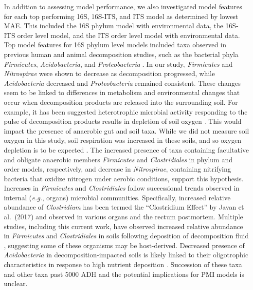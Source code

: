 \documentclass[
  10pt,
  letterpaper,
]{article}
\begin{document}
In addition to assessing model performance, we also investigated model
features for each top performing 16S, 16S-ITS, and ITS model as
determined by lowest MAE. This included the 16S phylum model with
environmental data, the 16S-ITS order level model, and the ITS order
level model with environmental data. Top model features for 16S phylum
level models included taxa observed in previous human and animal
decomposition studies, such as the bacterial phyla \emph{Firmicutes},
\emph{Acidobacteria}, and \emph{Proteobacteria}
\citep{cobaugh_functional_2015, metcalf_microbial_2016}. In our study,
\emph{Firmicutes} and \emph{Nitrospirae} were shown to decrease as
decomposition progressed, while \emph{Acidobacteria} decreased and
\emph{Proteobacteria} remained consistent. These changes seem to be
linked to differences in metabolism and environmental changes that occur
when decomposition products are released into the surrounding soil. For
example, it has been suggested heterotrophic microbial activity
responding to the pulse of decomposition products results in depletion
of soil oxygen \citep{taylor_transient_2024, keenan_mortality_2018}.
This would impact the presence of anaerobic gut and soil taxa. While we
did not measure soil oxygen in this study, soil respiration was
increased in these soils, and so oxygen depletion is to be expected
\citep{mason_body_2022}. The increased presence of taxa containing
facultative and obligate anaerobic members \emph{Firmicutes} and
\emph{Clostridiales} in phylum and order models, respectively, and
decrease in \emph{Nitrospirae}, containing nitrifying bacteria that
oxidize nitrogen under aerobic conditions, support this hypothesis.
Increases in \emph{Firmicutes} and \emph{Clostridiales} follow
successional trends observed in internal (\emph{e.g.}, organs) microbial
communities. Specifically, increased relative abundance of
\emph{Clostridium} has been termed the ``Clostridium Effect'' by Javan
et al.~(2017) \citep{javan_cadaver_2017} and observed in various organs
\citep{javan_human_2016, javan_cadaver_2017} and the rectum
\citep{debruyn_postmortem_2017} postmortem. Multiple studies, including
this current work, have observed increased relative abundance in
\emph{Firmicutes} and \emph{Clostridiales} in soils following deposition
of decomposition fluid
\citep{cobaugh_functional_2015, mason_microbial_2023, singh_temporal_2018, keenan_microbial_2023},
suggesting some of these organisms may be host-derived. Decreased
presence of \emph{Acidobacteria} in decomposition-impacted soils is
likely linked to their oligotrophic characteristics in response to high
nutrient deposition \citep{cobaugh_functional_2015, fierer_toward_2007}.
Succession of these taxa and other taxa past 5000 ADH and the potential
implications for PMI models is unclear.
\end{document}
